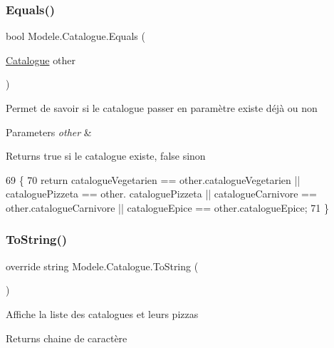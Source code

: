 \subsubsection{\texorpdfstring{Equals()}{Equals()}}
{\footnotesize\ttfamily bool Modele.\+Catalogue.\+Equals (\begin{DoxyParamCaption}\item[{\hyperlink{classModele_1_1Catalogue}{Catalogue}}]{other }\end{DoxyParamCaption})\hspace{0.3cm}{\ttfamily [inline]}}



Permet de savoir si le catalogue passer en paramètre existe déjà ou non 


\begin{DoxyParams}{Parameters}
{\em other} & \\
\hline
\end{DoxyParams}
\begin{DoxyReturn}{Returns}
true si le catalogue existe, false sinon
\end{DoxyReturn}

\begin{DoxyCode}
69         \{
70             \textcolor{keywordflow}{return} catalogueVegetarien == other.catalogueVegetarien || cataloguePizzeta == other.
      cataloguePizzeta || catalogueCarnivore == other.catalogueCarnivore || catalogueEpice == other.catalogueEpice;
71         \}
\end{DoxyCode}
\mbox{\label{classModele_1_1Catalogue_a09a355cd9bd72cd019bc7c68dd2d4b0a}} 
\subsubsection{\texorpdfstring{To\+String()}{ToString()}}
{\footnotesize\ttfamily override string Modele.\+Catalogue.\+To\+String (\begin{DoxyParamCaption}{ }\end{DoxyParamCaption})\hspace{0.3cm}{\ttfamily [inline]}}



Affiche la liste des catalogues et leurs pizzas 

\begin{DoxyReturn}{Returns}
chaine de caractère
\end{DoxyReturn}

